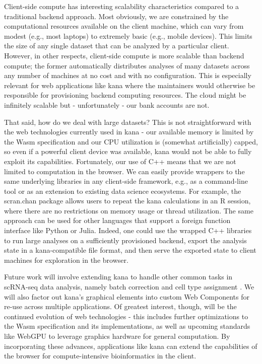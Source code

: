 \documentclass{article}
\begin{document}
Client-side compute has interesting scalability characteristics compared to a traditional backend approach.
Most obviously, we are constrained by the computational resources available on the client machine,
which can vary from modest (e.g., most laptops) to extremely basic (e.g., mobile devices).
This limits the size of any single dataset that can be analyzed by a particular client.
However, in other respects, client-side compute is more scalable than backend compute;
the former automatically distributes analyses of many datasets across any number of machines at no cost and with no configuration.
This is especially relevant for web applications like kana where the maintainers would otherwise be responsible for provisioning backend computing resources.
The cloud might be infinitely scalable but - unfortunately - our bank accounts are not.

That said, how do we deal with large datasets?
This is not straightforward with the web technologies currently used in kana -
our available memory is limited by the Wasm specification and our CPU utilization is (somewhat artificially) capped,
so even if a powerful client device was available, kana would not be able to fully exploit its capabilities.
Fortunately, our use of C++ means that we are not limited to computation in the browser.
We can easily provide wrappers to the same underlying libraries in any client-side framework, e.g., as a command-line tool or as an extension to existing data science ecosystems.
For example, the scran.chan package \cite{scranchan} allows users to repeat the kana calculations in an R session,
where there are no restrictions on memory usage or thread utilization.
The same approach can be used for other languages that support a foreign function interface like Python or Julia.
Indeed, one could use the wrapped C++ libraries to run large analyses on a sufficiently provisioned backend, 
export the analysis state in a kana-compatible file format,
and then serve the exported state to client machines for exploration in the browser. 

Future work will involve extending kana to handle other common tasks in scRNA-seq data analysis,
namely batch correction \cite{haghverdi2018batch} and cell type assignment \cite{aran2019reference}.
We will also factor out kana's graphical elements into custom Web Components for re-use across multiple applications. 
Of greatest interest, though, will be the continued evolution of web technologies -
this includes further optimizations to the Wasm specification and its implementations,
as well as upcoming standards like WebGPU to leverage graphics hardware for general computation.
By incorporating these advances, applications like kana can extend the capabilities of the browser for compute-intensive bioinformatics in the client.
\end{document}
